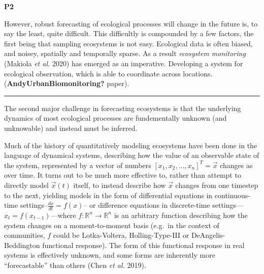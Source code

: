 \documentclass[11pt]{article}
\begin{document}
\textbf{P2}

However, robust forecasting of ecological processes will change in the
future is, to say the least, quite difficult. This difficultly is
compounded by a few factors, the first being that sampling ecosystems is
not easy. Ecological data is often biased, and noisey, spatially and
temporally sparse. As a result \emph{ecosystem monitoring} (Makiola
\emph{et al.} 2020) has emerged as an imperative. Developing a system
for ecological observation, which is able to coordinate across
locations. (\textbf{AndyUrbanBiomonitoring?} paper).

\begin{center}\rule{0.5\linewidth}{0.5pt}\end{center}

The second major challenge in forecasting ecosystems is that the
underlying dynamics of most ecological processes are fundementally
unknown (and unknowable) and instead must be inferred.

Much of the history of quantitatively modeling ecosystems have been done
in the language of dynamical systems, describing how the value of an
observable state of the system, represented by a vector of numbers
\([x_1, x_2, \dots, x_n]^T = \vec{x}\) changes as over time. It turns
out to be much more effective to, rather than attempt to directly model
\(\vec{x}(t)\) itself, to instead describe how \(\vec{x}\) changes from
one timestep to the next, yielding models in the form of differential
equations in continuous-time settings--\(\frac{dx}{dt} = f(x)\)-- or
difference equations in discrete-time
settings---\(x_t = f(x_{t-1})\)---where
\(f:\mathbb{R}^n \to \mathbb{R}^n\) is an arbitrary function describing
how the system changes on a moment-to-moment basis (e.g.~in the context
of communities, \(f\) could be Lotka-Voltera, Holling-Type-III or
DeAngelis-Beddington functional response). The form of this functional
response in real systems is effectively unknown, and some forms are
inherently more ``forecastable'' than others (Chen \emph{et al.} 2019).
\end{document}

